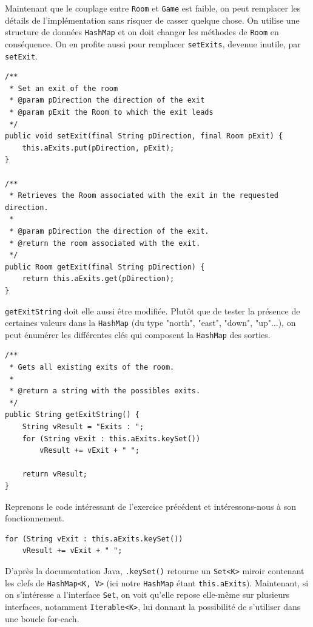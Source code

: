 \documentclass[a4paper,12pt]{report}
\begin{document}
\begin{exercise}[subtitle=HashMap et setExit]

Maintenant que le couplage entre \verb|Room| et \verb|Game| est faible, on peut remplacer les détails de l'implémentation sans risquer de casser quelque chose. On utilise une structure de données \verb|HashMap| et on doit changer les méthodes de \verb|Room| en conséquence. On en profite aussi pour remplacer \verb|setExits|, devenue inutile, par \verb|setExit|.

\vfill

\begin{verbatim}
/**
 * Set an exit of the room
 * @param pDirection the direction of the exit
 * @param pExit the Room to which the exit leads
 */
public void setExit(final String pDirection, final Room pExit) {
    this.aExits.put(pDirection, pExit);
}

/**
 * Retrieves the Room associated with the exit in the requested direction.
 *
 * @param pDirection the direction of the exit.
 * @return the room associated with the exit.
 */
public Room getExit(final String pDirection) {
    return this.aExits.get(pDirection);
}
\end{verbatim}
\end{exercise}

\begin{exercise}[subtitle=keySet]

\verb|getExitString| doit elle aussi être modifiée. Plutôt que de tester la présence de certaines valeurs dans la \verb|HashMap| (du type "north", "east", "down", "up"...), on peut énumérer les différentes clés qui composent la \verb|HashMap| des sorties.

\begin{verbatim}
/**
 * Gets all existing exits of the room.
 *
 * @return a string with the possibles exits.
 */
public String getExitString() {
    String vResult = "Exits : ";
    for (String vExit : this.aExits.keySet())
        vResult += vExit + " ";

    return vResult;
}
\end{verbatim}
\end{exercise}

\begin{exercise}[subtitle=Fonctionnement de keySet]

Reprenons le code intéressant de l'exercice précédent et intéressons-nous à son fonctionnement.

\begin{verbatim}
for (String vExit : this.aExits.keySet())
    vResult += vExit + " ";
\end{verbatim}

D'après la documentation Java, \texttt{.keySet()} retourne un \verb|Set<K>| miroir contenant les clefs de \verb|HashMap<K, V>| (ici notre \verb|HashMap| étant  \texttt{this.aExits}). Maintenant, si on s'intéresse a l'interface \verb|Set|, on voit qu'elle repose elle-même sur plusieurs interfaces, notamment \verb|Iterable<K>|, lui donnant la possibilité de s'utiliser dans une boucle for-each.

\end{exercise}
\end{document}
